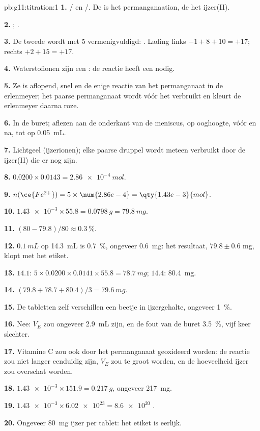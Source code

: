 \begin{solution}{pb:g11:titration:1}
\textbf{1.} / en /. De
 is het permanganaation, de  het ijzer(II).

\textbf{2.} ;
.

\textbf{3.} De tweede wordt met 5 vermenigvuldigd:
. Lading
links $-1 + 8 + 10 = +17$; rechts $+2 + 15 = +17$.

\textbf{4.} Waterstofionen zijn een : de reactie heeft een  nodig.

\textbf{5.} Ze is aflopend, snel en de enige reactie van het
permanganaat in de erlenmeyer; het paarse permanganaat wordt vóór het
 verbruikt en kleurt de erlenmeyer daarna roze.

\textbf{6.} In de buret; aflezen aan de onderkant van de meniscus, op
ooghoogte, vóór en na, tot op \qty{0.05}{mL}.

\textbf{7.} Lichtgeel (ijzerionen); elke paarse druppel wordt meteen
verbruikt door de ijzer(II) die er nog zijn.

\textbf{8.} $0.0200 \times 0.0143 = \qty{2.86e-4}{mol}$.

\textbf{9.} $n(\ce{Fe^{2+}}) = 5 \times \num{2.86e-4} =
\qty{1.43e-3}{mol}$.

\textbf{10.} $\num{1.43e-3} \times 55.8 = \qty{0.0798}{g} =
\qty{79.8}{mg}$.

\textbf{11.} $(80 - 79.8)/80 \approx \qty{0.3}{\percent}$.

\textbf{12.} $\qty{0.1}{mL}$ op \qty{14.3}{mL} is \qty{0.7}{\percent},
ongeveer \qty{0.6}{mg}: het resultaat, $79.8 \pm 0.6$ mg, klopt met het
etiket.

\textbf{13.} $14.1$: $5 \times 0.0200 \times 0.0141 \times 55.8 =
\qty{78.7}{mg}$; $14.4$: \qty{80.4}{mg}.

\textbf{14.} $(79.8 + 78.7 + 80.4)/3 = \qty{79.6}{mg}$.

\textbf{15.} De tabletten zelf verschillen een beetje in ijzergehalte,
ongeveer \qty{1}{\percent}.

\textbf{16.} Nee: $V_E$ zou ongeveer \qty{2.9}{mL} zijn, en de fout van
de buret \qty{3.5}{\percent}, vijf keer slechter.

\textbf{17.} Vitamine C zou ook door het permanganaat geoxideerd worden:
de reactie zou niet langer eenduidig zijn, $V_E$ zou te groot worden, en
de hoeveelheid ijzer zou overschat worden.

\textbf{18.} $\num{1.43e-3} \times 151.9 = \qty{0.217}{g}$, ongeveer
\qty{217}{mg}.

\textbf{19.} $\num{1.43e-3} \times \num{6.02e23} = \num{8.6e20}$ .

\textbf{20.} Ongeveer \qty{80}{mg} ijzer per tablet: het etiket is
eerlijk.
\end{solution}
